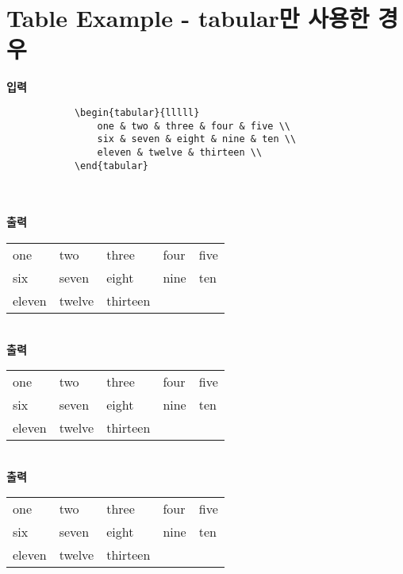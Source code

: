\documentclass[12pt,a4paper]{report}
\begin{document}
\clearpage
\section{Table Example - tabular만 사용한 경우}

	\singlespacing
	\textbf{입력}\\
		\begin{boxedminipage}[t]{1.0\linewidth}
		\small
		\begin{verbatim}	
			\begin{tabular}{lllll}
				one & two & three & four & five \\
				six & seven & eight & nine & ten \\
				eleven & twelve & thirteen \\
			\end{tabular} 
		\end{verbatim} 
		\end{boxedminipage} \\ \\

		\textbf{출력}
		\begin{tabular}{lllll}
			\hline
			one & two & three & four & five \\
			six & seven & eight & nine & ten \\
			eleven & twelve & thirteen \\
			\hline
		\end{tabular} \\
		
		\textbf{출력} \\
		\begin{tabular}{lllll}
			\toprule
			one & two & three & four & five \\
			six & seven & eight & nine & ten \\
			eleven & twelve & thirteen \\
			\bottomrule
		\end{tabular} \\
		
	\doublespacing
		\textbf{출력} \\
		\begin{tabular}{lllll}
			\toprule
			one & two & three & four & five \\
			six & seven & eight & nine & ten \\
			eleven & twelve & thirteen \\
			\bottomrule
		\end{tabular} \\
\end{document}
